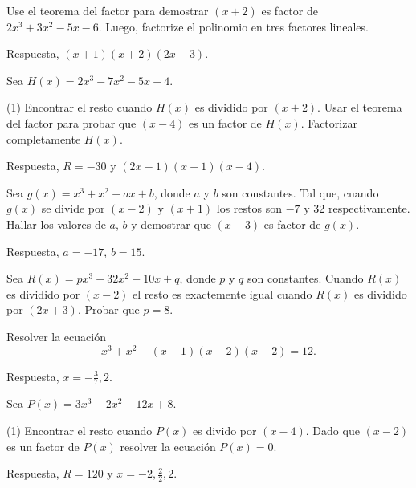 \begin{exercise}
    Use el teorema del factor para demostrar $(x + 2)$ es factor de $2x^3 + 3x^2 - 5x - 6$.
    Luego, factorize el polinomio en tres factores lineales.

    Respuesta, $\boxed{(x + 1)(x + 2)(2x - 3)}$.
\end{exercise}

\begin{exercise}
    Sea $H(x) = 2x^3 - 7x^2 - 5x + 4$.
    \begin{tasks}[label=\alph*.](1)
        \task Encontrar el resto cuando $H(x)$ es dividido por $(x + 2)$.
        \task Usar el teorema del factor para probar que $(x - 4)$ es un factor de $H(x)$.
        \task Factorizar completamente $H(x)$.
    \end{tasks}

    Respuesta, $\boxed{R = -30}$ y $\boxed{(2x - 1)(x + 1)(x - 4)}$.
\end{exercise}

\begin{exercise}
    Sea $g(x) = x^3 + x^2 + ax + b$, donde $a$ y $b$ son constantes.
    Tal que, cuando $g(x)$ se divide por $(x - 2)$ y $(x + 1)$ los restos son $-7$ y 32 respectivamente.
    Hallar los valores de $a$, $b$ y demostrar que $(x - 3)$ es factor de $g(x)$.

    Respuesta, $\boxed{a=-17}$, $\boxed{b = 15}$.
\end{exercise}

\begin{exercise}
    Sea $R(x) = px^3 - 32x^2 - 10x + q$, donde $p$ y $q$ son constantes.
    Cuando $R(x)$ es dividido por $(x - 2)$ el resto es exactemente igual cuando $R(x)$ es dividido por $(2x + 3)$.
    Probar que $p = 8$.
\end{exercise}

\begin{exercise}
    Resolver la ecuación
    \[
        x^3 + x^2 - (x - 1)(x - 2)(x - 2) = 12.
    \]

    Respuesta, $\boxed{x = -\frac{3}{7}, 2}$.
\end{exercise}

\begin{exercise}
    Sea $P(x) = 3x^3 - 2x^2 - 12x + 8$.
    \begin{tasks}[label=\alph*.](1)
        \task Encontrar el resto cuando $P(x)$ es divido por $(x - 4)$.
        \task Dado que $(x - 2)$ es un factor de $P(x)$ resolver la ecuación $P(x) = 0$.
    \end{tasks}
    Respuesta, $\boxed{R = 120}$ y $\boxed{x = -2, \frac{2}{2}, 2}$.
\end{exercise}